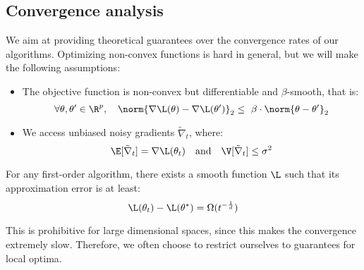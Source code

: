 \subsection{Convergence analysis}
We aim at providing theoretical guarantees over the convergence rates of our algorithms. Optimizing non-convex functions is hard in general, but we will make the following assumptions:
\begin{itemize}
    \item The objective function is non-convex but differentiable and $\beta$-smooth, that is:
    \begin{equation*}
        \forall\theta,\theta'\in\R^p, \quad \norm{\nabla\L(\theta)-\nabla\L(\theta')}_2 \leq \beta\cdot\norm{\theta-\theta'}_2
    \end{equation*}
    \item We access unbiased noisy gradients $\tilde{\nabla}_t$, where:
    \begin{equation*}
        \E[\tilde{\nabla}_t] = \nabla\L(\theta_t) \quad \textnormal{and} \quad \V[\tilde{\nabla}_t] \leq\sigma^2
    \end{equation*}
\end{itemize}

\begin{property}
    For any first-order algorithm, there exists a smooth function $\L$ such that its approximation error is at least:
    \begin{equation*}
        \L(\theta_t)-\L(\theta^*) = \Omega(t^{-\frac{1}{d}})
    \end{equation*}
\end{property}
This is prohibitive for large dimensional spaces, since this makes the convergence extremely slow. Therefore, we often choose to restrict ourselves to guarantees for local optima.

